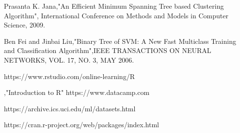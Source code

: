 \documentclass[a4paper, 10pt, conference]{ieeeconf}      %
\begin{document}
\begin{thebibliography}{99}
\bibitem{} Prasanta K. Jana{,"An Efficient Minimum Spanning Tree based Clustering Algorithm"}, International Conference on Methods and Models in Computer Science, 2009.

\bibitem{}Ben Fei and Jinbai Liu{,"Binary Tree of SVM: A New Fast Multiclass
Training and Classification Algorithm"},IEEE TRANSACTIONS ON NEURAL NETWORKS, VOL. 17, NO. 3, MAY 2006.

\bibitem{} https://www.rstudio.com/online-learning/R

\bibitem{} {,"Introduction to R"} https://www.datacamp.com

\bibitem{} https://archive.ics.uci.edu/ml/datasets.html

\bibitem{} https://cran.r-project.org/web/packages/index.html


\end{thebibliography}
\end{document}
